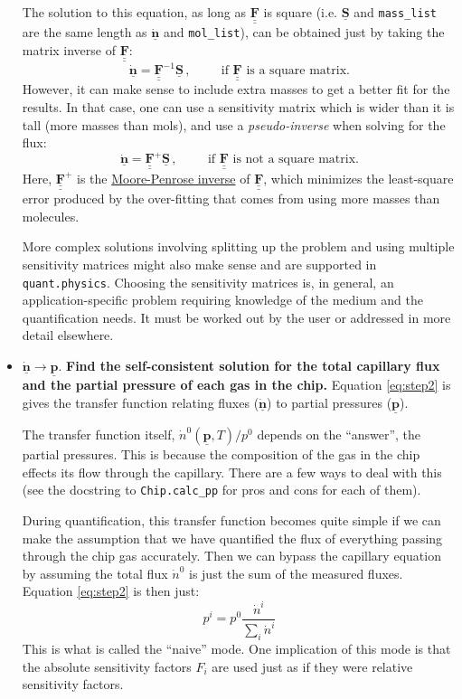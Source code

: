 \documentclass{article}
\newcommand{\code}[1]{\colorbox{codegray}{\lstinline{#1}}}
\renewcommand{\vec}[1]{\underline{\mathbf{#1}}}
\newcommand{\mat}[1]{\underline{\underline{\mathbf{#1}}}}
\begin{document}
\begin{itemize}
	The solution to this equation, as long as $\mat{F}$ is square (i.e. $\vec{S}$ and \code{mass_list} are the same length as $\vec{\dot{n}}$ and \code{mol_list}), can be obtained just by taking the matrix inverse of $\mat{F}$:
	\begin{equation}
		\vec{\dot{n}} = \mat{F}^{-1} \vec{S}\,, \hspace{1cm} \text{if $\mat{F}$ is a square matrix.}\label{eq:Q1}
	\end{equation}
	However, it can make sense to include extra masses to get a better fit for the results. In that case, one can use a sensitivity matrix which is wider than it is tall (more masses than mols), and use a \textit{pseudo-inverse} when solving for the flux:
	\begin{equation}
	\vec{\dot{n}} = \mat{F}^{+} \vec{S}\,, \hspace{1cm} \text{if $\mat{F}$ is not a square matrix.}\label{eq:Q2}
	\end{equation}
	Here, $\mat{F}^+$ is the \href{https://en.wikipedia.org/wiki/Moore\%E2\%80\%93Penrose_inverse}{Moore-Penrose inverse} of $\mat{F}$, which minimizes the least-square error produced by the over-fitting that comes from using more masses than molecules.
	
	More complex solutions involving splitting up the problem and using multiple sensitivity matrices might also make sense and are supported in \code{quant.physics}. Choosing the sensitivity matrices is, in general, an application-specific problem requiring knowledge of the medium and the quantification needs. It must be worked out by the user or addressed in more detail elsewhere.
	
	\item $\vec{\dot{n}} \rightarrow \vec{p}$. \textbf{Find the self-consistent solution for the total capillary flux and the partial pressure of each gas in the chip.} Equation \ref{eq:step2} is gives the transfer function relating fluxes ($\vec{\dot{n}}$) to partial pressures ($\vec{p}$). 
	
	The transfer function itself, $\dot{n}^0(\vec{p}, T)/p^0$ depends on the ``answer'', the partial pressures. This is because the composition of the gas in the chip effects its flow through the capillary. There are a few ways to deal with this (see the docstring to \code{Chip.calc_pp} for pros and cons for each of them).
	
	During quantification, this transfer function becomes quite simple if we can make the assumption that we have quantified the flux of everything passing through the chip gas accurately. Then we can bypass the capillary equation by assuming the total flux $\dot{n}^0$ is just the sum of the measured fluxes. Equation \ref{eq:step2} is then just:
	\begin{equation}
	p^i = p^0 \frac{\dot{n}^i}{\sum_i \dot{n}^i}\label{eq:naive}
	\end{equation}
	This is what is called the ``naive'' mode. One implication of this mode is that the absolute sensitivity factors $F_i$ are used just as if they were relative sensitivity factors.
	

\end{itemize}
\end{document}
